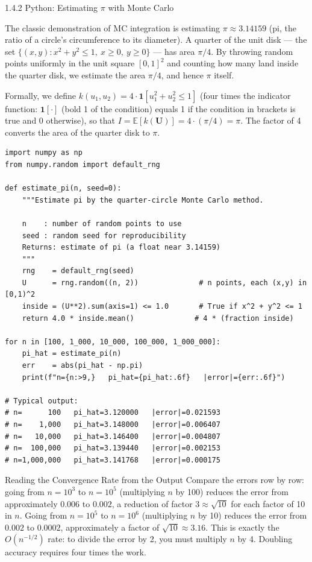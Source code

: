 \documentclass[aspectratio=169,10pt]{beamer}
\begin{document}
\begin{frame}[fragile]{1.4.2 Python: Estimating $\pi$ with Monte Carlo}

  The classic demonstration of MC integration is estimating $\pi \approx
  3.14159$ (pi, the ratio of a circle's circumference to its diameter).
  A quarter of the unit disk --- the set $\{(x,y) : x^2 + y^2 \le 1,\
  x \ge 0,\ y \ge 0\}$ --- has area $\pi/4$.  By throwing random points
  uniformly in the unit square $[0,1]^2$ and counting how many land inside the
  quarter disk, we estimate the area $\pi/4$, and hence $\pi$ itself.

  Formally, we define $k(u_1, u_2) = 4 \cdot \mathbf{1}[u_1^2 + u_2^2 \le 1]$
  (four times the indicator function: $\mathbf{1}[\cdot]$ (bold 1 of the
  condition) equals 1 if the condition in brackets is true and 0 otherwise),
  so that $I = \mathbb{E}[k(\mathbf{U})] = 4 \cdot (\pi/4) = \pi$.  The factor
  of 4 converts the area of the quarter disk to $\pi$.

\begin{lstlisting}[style=python]
import numpy as np
from numpy.random import default_rng

def estimate_pi(n, seed=0):
    """Estimate pi by the quarter-circle Monte Carlo method.

    n    : number of random points to use
    seed : random seed for reproducibility
    Returns: estimate of pi (a float near 3.14159)
    """
    rng    = default_rng(seed)
    U      = rng.random((n, 2))              # n points, each (x,y) in [0,1)^2
    inside = (U**2).sum(axis=1) <= 1.0       # True if x^2 + y^2 <= 1
    return 4.0 * inside.mean()              # 4 * (fraction inside)

for n in [100, 1_000, 10_000, 100_000, 1_000_000]:
    pi_hat = estimate_pi(n)
    err    = abs(pi_hat - np.pi)
    print(f"n={n:>9,}   pi_hat={pi_hat:.6f}   |error|={err:.6f}")

# Typical output:
# n=      100   pi_hat=3.120000   |error|=0.021593
# n=    1,000   pi_hat=3.148000   |error|=0.006407
# n=   10,000   pi_hat=3.146400   |error|=0.004807
# n=  100,000   pi_hat=3.139440   |error|=0.002153
# n=1,000,000   pi_hat=3.141768   |error|=0.000175
\end{lstlisting}

  \begin{exampleblock}{Reading the Convergence Rate from the Output}
    Compare the errors row by row: going from $n = 10^3$ to $n = 10^5$
    (multiplying $n$ by 100) reduces the error from approximately $0.006$ to
    $0.002$, a reduction of factor $3 \approx \sqrt{10}$ for each factor of 10
    in $n$.  Going from $n = 10^5$ to $n = 10^6$ (multiplying $n$ by 10)
    reduces the error from $0.002$ to $0.0002$, approximately a factor of
    $\sqrt{10} \approx 3.16$.  This is exactly the $O(n^{-1/2})$ rate: to
    divide the error by 2, you must multiply $n$ by 4.  Doubling accuracy
    requires four times the work.
  \end{exampleblock}

\end{frame}
\end{document}
